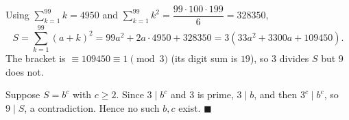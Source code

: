Using $\displaystyle\sum_{k=1}^{99}k=4950$ and $\displaystyle\sum_{k=1}^{99}k^2=\dfrac{99\cdot100\cdot199}{6}=328350$,
\[
S=\sum_{k=1}^{99}(a+k)^2=99a^2+2a\cdot4950+328350=3\left(33a^2+3300a+109450\right).
\]
The bracket is $\equiv109450\equiv1\pmod3$ (its digit sum is $19$), so $3$ divides $S$ but $9$ does not.

Suppose $S=b^c$ with $c\ge2$. Since $3\mid b^c$ and $3$ is prime, $3\mid b$, and then $3^c\mid b^c$, so $9\mid S$, a contradiction. Hence no such $b,c$ exist. $\blacksquare$
